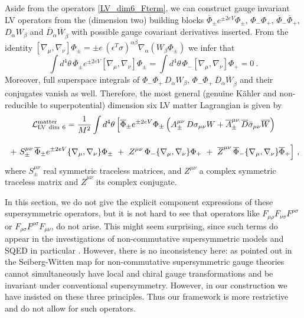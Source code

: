\documentclass[12pt]{revtex4}
\begin{document}
Aside from the operators \eqref{LV_dim6_Fterm}, we can 
construct gauge invariant LV operators from the (dimension two)
building blocks  
$\overline{\Phi}_\pm e^{\pm 2e V} \Phi_\pm$, $\Phi_- \Phi_+$, 
$\overline{\Phi}_- \overline{\Phi}_+$, $D_\alpha W_\beta$ and
$\overline{D}_{\dot\alpha} \overline{W}_{\dot\beta}$ with possible
gauge covariant derivatives inserted. From the identity 
\(
[ \nabla_\mu, \nabla_\nu] \Phi_\pm = \pm e \, 
(\epsilon^T \sigma)^{\alpha\beta} \nabla_\alpha( W_\beta \Phi_\pm)
\)
we infer that 
\begin{equation}
\int d^4\theta\, \overline{\Phi}_\pm e^{\pm 2eV} 
[ \nabla_\mu, \nabla_\nu] \Phi_\pm  
= \int d^4\theta\, \Phi_- [ \nabla_\mu, \nabla_\nu] \Phi_+ = 0~. 
\end{equation} 
Moreover, full superspace integrals of 
$\Phi_- \Phi_+\, D_\alpha W_\beta$, 
$\Phi_- \Phi_+\, \overline{D}_{\dot\alpha} \overline{W}_{\dot\beta}$ 
and their conjugates vanish as well. Therefore, the most general
(genuine K\"ahler and non-reducible to superpotential) dimension six LV matter Lagrangian is given by 
\begin{gather}
{\cal L}_{\rm LV\ dim\ 6}^{\rm matter}  = \frac{1}{M^2}
\int d^4 \theta\, \Big[ 
\overline{\Phi}_\pm e^{\pm 2eV} \Phi_\pm \, 
\Big( 
A_\pm^{\mu\nu} \, D \sigma_{\mu\nu} W + 
\overline{A}_\pm^{\mu\nu} \, \overline{D} \bar\sigma_{\mu\nu} \overline{W}
\Big) 
\nonumber \\[2ex]
~+~ S_\pm^{\mu\nu}\,  \overline{\Phi}_\pm e^{\pm 2eV} 
\lbrace \nabla_\mu, \nabla_\nu \rbrace \Phi_\pm  
~+~ Z^{\mu\nu}\,  \Phi_- \lbrace \nabla_\mu, \nabla_\nu \rbrace \Phi_+ 
~+~ \overline{Z}^{\mu\nu}\,  
\overline{\Phi}_- \lbrace \nabla_\mu, \nabla_\nu \rbrace \overline{\Phi}_+ 
 \Big]~, 
 \label{LV_dim6_Dterm}
\end{gather}
where $S_\pm^{\mu\nu}$ real symmetric traceless matrices, and 
$Z^{\mu\nu}$ a complex symmetric traceless matrix and
$\overline{Z}^{\mu\nu}$ its complex conjugate. 




In this section, we do not give the explicit component expressions of
these supersymmetric operators, but it is not hard to see that
operators like 
 $ F_{\mu\rho}F_{\nu\sigma}F^{\rho\sigma} $
or
  $ F_{\rho\sigma}F^{\rho\sigma}F_{\mu\nu} $, 
do not arise. This might seem surprising, since such terms do appear in
the investigations of non-commutative  supersymmetric models and SQED in
particular \cite{Putz:2002ib,Mikulovic:2003sq}. However, there is no
inconsistency here: as pointed out in \cite{Mikulovic:2003sq} the
Seiberg-Witten map for non-commutative supersymmetric gauge 
theories cannot simultaneously have local and chiral gauge
transformations and be invariant under conventional supersymmetry. 
However, in our construction we have insisted on these three
principles. Thus our framework is more restrictive and do not allow 
for such operators. 
\end{document}
